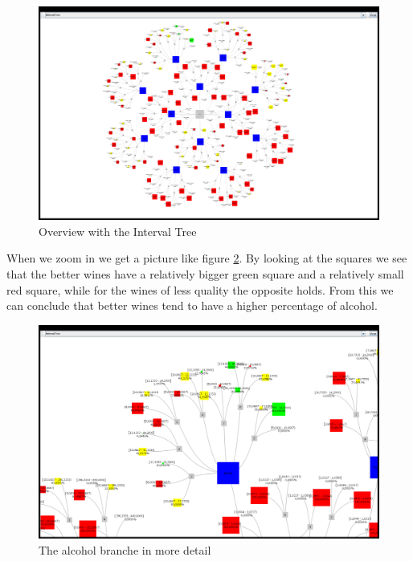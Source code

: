 \documentclass[a4paper,twoside,11pt]{article}
\begin{document}
\begin{figure}[!h]
  \centering
  \includegraphics[width=\textwidth]{20131105033557plot.png}
  \caption{Overview with the Interval Tree}
  \label{oit}
\end{figure}

When we zoom in we get a picture like figure \ref{ait}. By looking at the squares we see that the better wines have a relatively bigger green square and a relatively small red square, while for the wines of less quality the opposite holds. From this we can conclude that better wines tend to have a higher percentage of alcohol.
\begin{figure}[!h]
  \centering
  \includegraphics[width=\textwidth]{20131105034138plot.png}
  \caption{The alcohol branche in more detail}
  \label{ait}
\end{figure}
\end{document}
